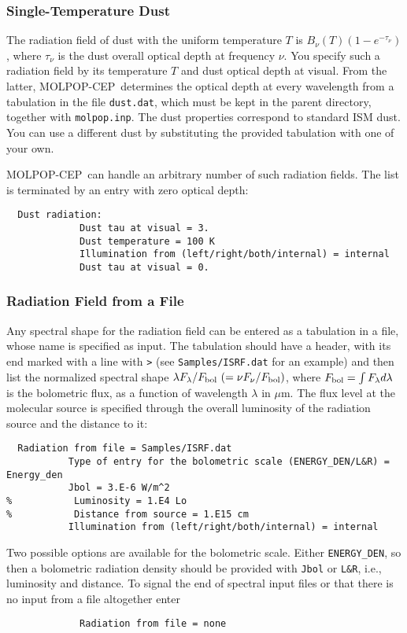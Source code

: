 \documentclass[12pt]{article}
\def\separation {0.5cm}
\def\mic      {\hbox{$\mu$m}}
\def\M{MOLPOP-CEP}
\begin{document}
\subsubsection{Single-Temperature Dust}

The radiation field of dust with the uniform temperature $T$ is $B_\nu(T)(1 -
e^{-\tau_\nu})$, where $\tau_\nu$ is the dust overall optical depth at
frequency $\nu$.  You specify such a radiation field by its temperature $T$ and
dust optical depth at visual. From the latter, \M\ determines the optical depth
at every wavelength from a tabulation in the file {\tt dust.dat}, which must be
kept in the parent directory, together with {\tt molpop.inp}. The dust
properties correspond to standard ISM dust. You can use a different dust by
substituting the provided tabulation with one of your own.

\M\ can handle an arbitrary number of such radiation fields. The list is
terminated by an entry with zero optical depth:

\vspace{\separation}
\begin{verbatim}
  Dust radiation:
             Dust tau at visual = 3.
             Dust temperature = 100 K
             Illumination from (left/right/both/internal) = internal
             Dust tau at visual = 0.
\end{verbatim}

\subsubsection{Radiation Field from a File}

Any spectral shape for the radiation field can be entered as a tabulation in a
file, whose name is specified as input. The tabulation should have a header, with
its end marked with a line with \texttt{>} (see \texttt{Samples/ISRF.dat} for an example)
and then list the
normalized spectral shape $\lambda F_\lambda/F_{\rm bol}\ (= \nu F_\nu/F_{\rm
bol})$, where $F_{\rm bol} = \int F_\lambda d\lambda$ is the bolometric flux,
as a function of wavelength $\lambda$ in \mic. The flux level at the molecular
source is specified through the overall luminosity of the radiation source and
the distance to it:

\vspace{\separation}
\begin{verbatim}
  Radiation from file = Samples/ISRF.dat
           Type of entry for the bolometric scale (ENERGY_DEN/L&R) = Energy_den
           Jbol = 3.E-6 W/m^2
%           Luminosity = 1.E4 Lo
%           Distance from source = 1.E15 cm
           Illumination from (left/right/both/internal) = internal
\end{verbatim}
Two possible options are available for the bolometric scale. Either \texttt{ENERGY\_DEN}, so then
a bolometric radiation density should be provided with \texttt{Jbol} or \texttt{L\&R}, i.e., luminosity
and distance.
To signal the end of spectral input files or that there is no input from a file
altogether enter
\begin{verbatim}
             Radiation from file = none
\end{verbatim}
\end{document}
